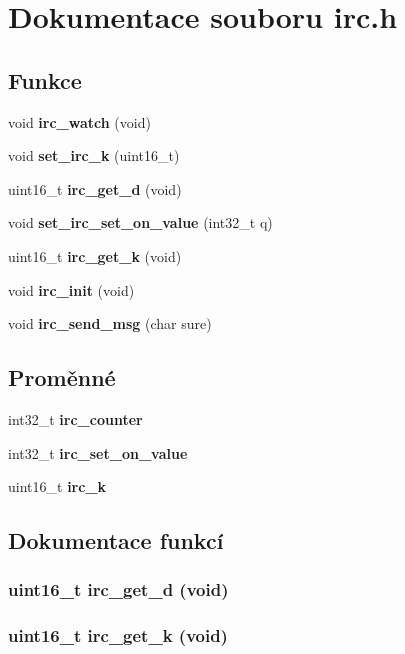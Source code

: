 \section{Dokumentace souboru irc.h}
\label{irc_8h}
\subsection*{Funkce}
\begin{CompactItemize}
\item 
void {\bf irc\_\-watch} (void)
\item 
void {\bf set\_\-irc\_\-k} (uint16\_\-t)
\item 
uint16\_\-t {\bf irc\_\-get\_\-d} (void)
\item 
void {\bf set\_\-irc\_\-set\_\-on\_\-value} (int32\_\-t q)
\item 
uint16\_\-t {\bf irc\_\-get\_\-k} (void)
\item 
void {\bf irc\_\-init} (void)
\item 
void {\bf irc\_\-send\_\-msg} (char sure)
\end{CompactItemize}
\subsection*{Proměnné}
\begin{CompactItemize}
\item 
int32\_\-t {\bf irc\_\-counter}
\item 
int32\_\-t {\bf irc\_\-set\_\-on\_\-value}
\item 
uint16\_\-t {\bf irc\_\-k}
\end{CompactItemize}


\subsection{Dokumentace funkcí}
\subsubsection{\setlength{\rightskip}{0pt plus 5cm}uint16\_\-t irc\_\-get\_\-d (void)}\label{irc_8h_cb7fb2dd68a049663856f3c58c5df035}


\subsubsection{\setlength{\rightskip}{0pt plus 5cm}uint16\_\-t irc\_\-get\_\-k (void)}\label{irc_8h_92a83fe95657fd7f8829bfb26ab5dce4}


